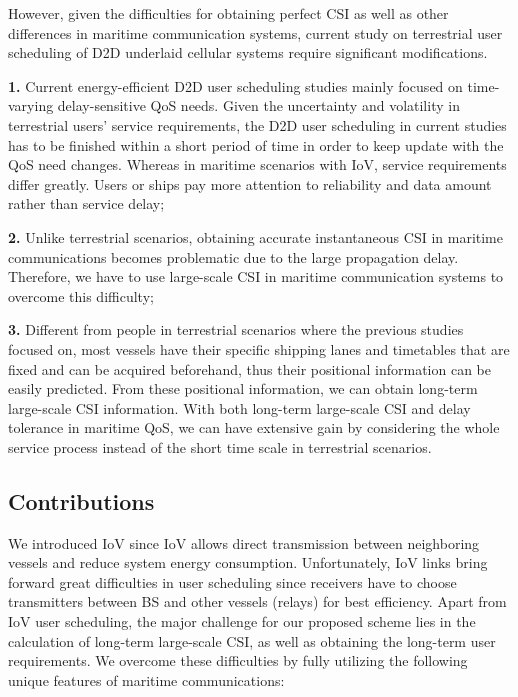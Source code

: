 \documentclass{ieeeaccess}
\begin{document}
However, given the difficulties for obtaining perfect CSI as well as other differences in maritime communication systems, current study on terrestrial user scheduling of D2D underlaid cellular systems require significant modifications. 

\textbf{1.} Current energy-efficient D2D user scheduling studies mainly focused on time-varying delay-sensitive QoS needs. Given the uncertainty and volatility in terrestrial users' service requirements, the D2D user scheduling in current studies has to be finished within a short period of time in order to keep update with the QoS need changes. 
Whereas in maritime scenarios with IoV, service requirements differ greatly. Users or ships pay more attention to reliability and data amount rather than service delay; 

\textbf{2.} Unlike terrestrial scenarios, obtaining accurate instantaneous CSI in maritime communications becomes problematic due to the large propagation delay. Therefore, we have to use large-scale CSI in maritime communication systems to overcome this difficulty; 

\textbf{3.} Different from people in terrestrial scenarios where the previous studies focused on, most vessels have their specific shipping lanes and timetables that are fixed and can be acquired beforehand, thus their positional information can be easily predicted. From these positional information, we can obtain long-term large-scale CSI information. With both long-term large-scale CSI and delay tolerance in maritime QoS, we can have extensive gain by considering the whole service process instead of the short time scale in terrestrial scenarios. 

\subsection{Contributions}


We introduced IoV since IoV allows direct transmission between neighboring vessels and reduce system energy consumption. Unfortunately, IoV links bring forward great difficulties in user scheduling since receivers have to choose transmitters between BS and other vessels (relays) for best efficiency. 
Apart from IoV user scheduling, the major challenge for our proposed scheme lies in the calculation of long-term large-scale CSI, as well as obtaining the long-term user requirements. We overcome these difficulties by fully utilizing the following unique features of maritime communications: 
\end{document}
